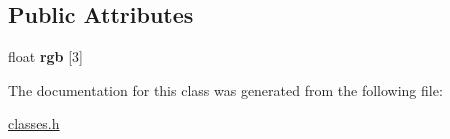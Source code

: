 \subsection*{Public Attributes}
\begin{DoxyCompactItemize}
\item 
\hypertarget{classColor_a4e66e3284da62fdc299fb701e3ec401c}{
float {\bfseries rgb} \mbox{[}3\mbox{]}}
\label{classColor_a4e66e3284da62fdc299fb701e3ec401c}

\end{DoxyCompactItemize}


The documentation for this class was generated from the following file:\begin{DoxyCompactItemize}
\item 
\hyperlink{classes_8h}{classes.h}\end{DoxyCompactItemize}

